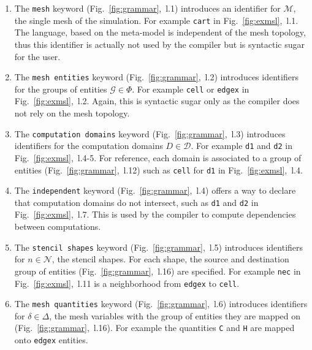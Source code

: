 \begin{enumerate}

\item The \texttt{mesh} keyword (Fig.~\ref{fig:grammar},~l.1) introduces an identifier for $\mathcal{M}$, the single mesh of the simulation. For example \texttt{cart} in Fig.~\ref{fig:exmsl},~l.1. The language, based on the meta-model is independent of the mesh topology, thus this identifier is actually not used by the compiler but is syntactic sugar for the user.

\item The \texttt{mesh entities} keyword (Fig.~\ref{fig:grammar},~l.2) introduces identifiers for the groups of entities $\mathcal{G}\in\Phi$. For example \texttt{cell} or \texttt{edgex} in Fig.~\ref{fig:exmsl},~l.2. Again, this is syntactic sugar only as the compiler does not rely on the mesh topology.

\item The \texttt{computation domains} keyword (Fig.~\ref{fig:grammar},~l.3) introduces identifiers for the computation domains $D\in\mathcal{D}$. For example \texttt{d1} and \texttt{d2} in Fig.~\ref{fig:exmsl},~l.4-5. For reference, each domain is associated to a group of entities (Fig.~\ref{fig:grammar},~l.12) such as \texttt{cell} for \texttt{d1} in Fig.~\ref{fig:exmsl},~l.4.

\item The \texttt{independent} keyword (Fig.~\ref{fig:grammar},~l.4) offers a way to declare that computation domains do not intersect, such as \texttt{d1} and \texttt{d2} in  Fig.~\ref{fig:exmsl},~l.7. This is used by the compiler to compute dependencies between computations.

\item The \texttt{stencil shapes} keyword (Fig.~\ref{fig:grammar},~l.5) introduces identifiers for $n\in\mathcal{N}$, the stencil shapes. For each shape, the source and destination group of entities (Fig.~\ref{fig:grammar},~l.16) are specified. For example \texttt{nec} in Fig.~\ref{fig:exmsl},~l.11 is a neighborhood from \texttt{edgex} to \texttt{cell}.

\item The \texttt{mesh quantities} keyword (Fig.~\ref{fig:grammar},~l.6) introduces identifiers for $\delta\in\Delta$, the mesh variables with the group of entities they are mapped on (Fig.~\ref{fig:grammar},~l.16). For example the quantities \texttt{C} and \texttt{H} are mapped onto \texttt{edgex} entities.


\end{enumerate}
